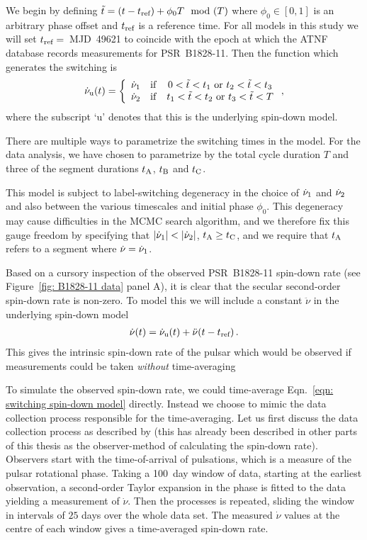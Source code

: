 \documentclass[../full_thesis/full_thesis.tex]{subfiles}
\begin{document}
We begin by defining $\tilde{t} = (t-t_{\textrm{ref}}) + \phi_{0}T\mod(T)$ where $\phi_0 \in [0,
1]$ is an arbitrary phase offset and $t_{\textrm{ref}}$ is a reference time. For all models
in this study we will set $t_{\textrm{ref}}=$~MJD~49621 to coincide with the epoch at which
the ATNF database \citet{Manchester1977} records measurements for PSR~B1828-11.
Then the function which generates the switching is
\begin{align}
\dot{\nu}_{\mathrm{u}}(t) = \left\{
    \begin{array}{ccc}
    \dot{\nu}_{1} & \mathrm{if} & 0 < \tilde{t} < t_{1}
    \textrm{ or } t_{2} < \tilde{t} < t_{3} \\
    \dot{\nu}_{2} & \mathrm{if} & t_{1} < \tilde{t} < t_{2}
    \textrm{ or } t_{3} < \tilde{t} < T\\
    \end{array}
    \right. ,
\end{align}
where the subscript `u' denotes that this is the underlying spin-down model.

There are multiple ways to parametrize the switching times in the model. For
the data analysis, we have chosen to parametrize by the total cycle duration
$T$ and three of the segment durations $t_{\mathrm{A}}$, $t_{\mathrm{B}}$ and $t_{\mathrm{C}}$.

This model is subject to label-switching degeneracy in the choice of
$\dot{\nu}_{1}$ and $\dot{\nu}_{2}$ and also between the various timescales and
initial phase $\phi_0$.  This degeneracy may cause difficulties in the MCMC
search algorithm, and we therefore fix this gauge freedom by specifying that
$|\dot{\nu}_{1}| < |\dot{\nu}_{2}|$, $t_{\mathrm{A}} \ge t_{\mathrm{C}}$, and we require that $t_{\mathrm{A}}$
refers to a segment where $\dot{\nu} = \dot{\nu}_{1}$.

Based on a cursory inspection of the observed PSR~B1828-11 spin-down rate (see
Figure~\ref{fig: B1828-11 data} panel A), it is clear that the secular
second-order spin-down rate is non-zero. To model this we will include a
constant $\ddot{\nu}$ in the underlying spin-down model
\begin{align}
    \dot{\nu}(t) = \dot{\nu}_{\mathrm{u}}(t) + \ddot{\nu}(t-t_{\textrm{ref}})\,.
\label{eqn: switching spin-down model}
\end{align}
This gives the intrinsic spin-down rate of the pulsar which would be observed if
measurements could be taken \emph{without} time-averaging

To simulate the observed spin-down rate, we could time-average Eqn.~\eqref{eqn:
switching spin-down model} directly. Instead we choose to mimic the data
collection process responsible for the time-averaging. Let
us first discuss the data collection process as described by \citet{Lyne2010} (this
has already been described in other parts of this thesis as the observer-method of
calculating the spin-down rate).
Observers start with the time-of-arrival of pulsations, which is a measure of
the pulsar rotational phase. Taking a 100~day window of data, starting at the
earliest observation, a second-order Taylor expansion in the phase is fitted to
the data yielding a measurement of $\dot{\nu}$. Then the processes is repeated,
sliding the window in intervals of $25$ days over the whole data set. The
measured $\dot{\nu}$ values at the centre of each window gives a time-averaged
spin-down rate.
\end{document}
